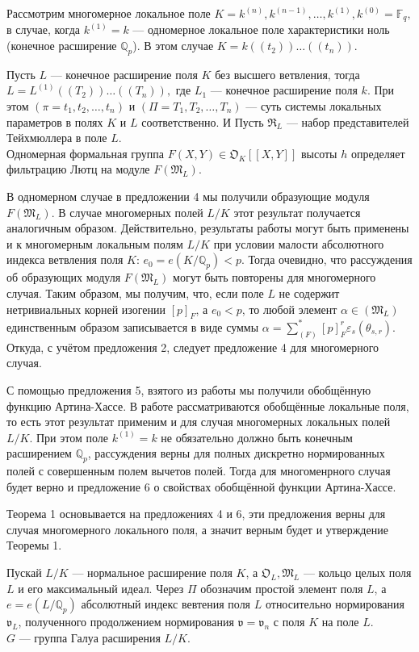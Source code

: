 \documentclass[a4paper]{article}
\newcommand{\Qp}{\mathbb{Q}_p}
\newcommand{\Fq}{\mathbb{F}_q}
\newcommand{\ML}{\mathfrak{M}_L}
\newcommand{\OK}{\mathfrak{O}_K}
\newcommand{\OL}{\mathfrak{O}_L}
\newcommand{\RL}{\mathfrak{R}_L}
\newcommand{\val}{\mathfrak{v}}
\begin{document}
\pagebreak

Рассмотрим многомерное локальное поле $K=k^{(n)}, k^{(n-1)},\dots,k^{(1)},k^{(0)}=\Fq,$ в случае, когда $k^{(1)} = k$ --- одномерное локальное поле характеристики ноль (конечное расширение $\Qp$). В этом случае $K = k((t_2))\dots((t_n)).$ 

Пусть $L$ --- конечное расширение поля $K$ без высшего ветвления, тогда $L = L^{(1)}((T_2))\dots((T_n)),$ где $L_1$ --- конечное расширение поля $k$. При этом $(\pi = t_1, t_2, \dots, t_n)$ и $(\Pi = T_1, T_2, \dots, T_n)$ --- суть системы локальных параметров в полях $K$ и $L$ соответственно. И Пусть $\RL$ --- набор представителей Тейхмюллера в поле $L$.\\

Одномерная формальная группа $F(X,Y)\in\OK[[X,Y]]$ высоты $h$ определяет фильтрацию Лютц на модуле $F(\ML)$.

В одномерном случае в предложении 4 мы получили образующие модуля $F(\ML)$. В случае многомерных полей $L/K$ этот результат получается аналогичным образом. Действительно, результаты работы \cite{book2} могут быть применены и к многомерным локальным полям $L/K$ при условии малости абсолютного индекса ветвления поля $K$: $e_0=e(K/\Qp)<p$. Тогда очевидно, что рассуждения об образующих модуля $F(\ML)$ могут быть повторены для многомерного случая. Таким образом, мы получим, что, если поле $L$ не содержит нетривиальных корней изогении $[p]_F$, а $e_0 < p$, то любой элемент $\alpha\in(\ML)$ единственным образом записывается в виде суммы $\alpha={\sum}_{(F)}^*[p]_F^r\varepsilon_s(\theta_{s,r})$. Откуда, с учётом предложения 2, следует предложение 4 для многомерного случая.

С помощью предложения 5, взятого из работы \cite{book3} мы получили обобщённую функцию Артина-Хассе. В работе \cite{book3} рассматриваются обобщённые локальные поля, то есть этот результат применим и для случая многомерных локальных полей $L/K$. При этом поле $k^{(1)}=k$ не обязательно должно быть конечным расширением $\Qp$, рассуждения верны для полных дискретно нормированных полей с совершенным полем вычетов полей. Тогда для многоменрного случая будет верно и предложение 6 о свойствах обобщённой функции Артина-Хассе.

Теорема 1 основывается на предложениях 4 и 6, эти предложения верны для случая многомерного локального поля, а значит верным будет и утверждение Теоремы 1.


\pagebreak

Пускай $L/K$ --- нормальное расширение поля $K$, а $\OL,\ML$ --- кольцо целых поля $L$ и его максимальный идеал. Через $\Pi$ обозначим простой элемент поля $L$, а $e=e(L/\Qp)$ абсолютный индекс вевтения поля $L$ относительно нормирования $\val_L$, полученного продолжением нормирования $\val=\val_n$ с поля $K$ на поле $L$.\\
$G$ --- группа Галуа расширения $L/K$.
\end{document}
